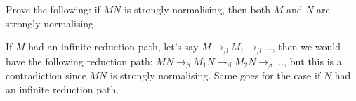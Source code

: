 \begin{problem}{1.17}    
Prove the following: if \(MN\) is strongly normalising, then both \(M\) and \(N\) are strongly normalising.
\end{problem}

\begin{solution}
    If $M$ had an infinite reduction path, let's say $M \to_\beta M_1 \to_\beta ...$, then we would have the following reduction path:
        $ MN \to_\beta M_1N \to_\beta M_2N \to_\beta ...$, but this is a contradiction since $MN$ is strongly normalising. Same goes for the case if $N$ had an infinite reduction path.
\end{solution}